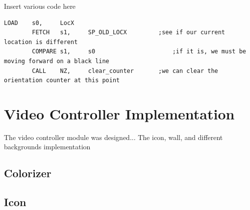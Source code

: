 \documentclass[11pt]{article}
\begin{document}
		
			
Insert various code here

\begin{lstlisting}[caption=Sequence used manage orientation counter , label=loc_check]		
		LOAD	s0, 	LocX
		FETCH	s1,		SP_OLD_LOCX			;see if our current location is different
		COMPARE	s1,		s0						;if it is, we must be moving forward on a black line
		CALL	NZ,		clear_counter		;we can clear the orientation counter at this point 	
 \end{lstlisting}


	
\section{Video Controller Implementation}
	The video controller module was designed...
	The icon, wall, and different backgrounds implementation
	
		
		\subsection{Colorizer}
		

%
				

				
		\subsection{Icon}
		
\end{document}
